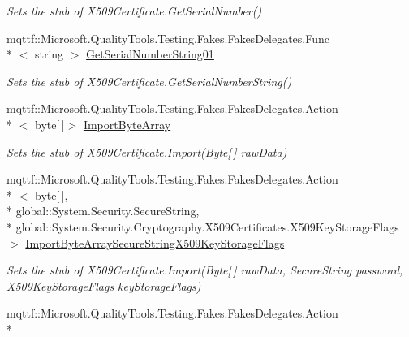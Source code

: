 \begin{DoxyCompactItemize}
\begin{DoxyCompactList}\small\item\em Sets the stub of X509\-Certificate.\-Get\-Serial\-Number()\end{DoxyCompactList}\item 
mqttf\-::\-Microsoft.\-Quality\-Tools.\-Testing.\-Fakes.\-Fakes\-Delegates.\-Func\\*
$<$ string $>$ \hyperlink{class_system_1_1_security_1_1_cryptography_1_1_x509_certificates_1_1_fakes_1_1_stub_x509_certificate_a5f0772ea53aebaf182afbcadb75f357c}{Get\-Serial\-Number\-String01}
\begin{DoxyCompactList}\small\item\em Sets the stub of X509\-Certificate.\-Get\-Serial\-Number\-String()\end{DoxyCompactList}\item 
mqttf\-::\-Microsoft.\-Quality\-Tools.\-Testing.\-Fakes.\-Fakes\-Delegates.\-Action\\*
$<$ byte\mbox{[}$\,$\mbox{]}$>$ \hyperlink{class_system_1_1_security_1_1_cryptography_1_1_x509_certificates_1_1_fakes_1_1_stub_x509_certificate_aaef214bfaef049fc7dda4081b8ee140f}{Import\-Byte\-Array}
\begin{DoxyCompactList}\small\item\em Sets the stub of X509\-Certificate.\-Import(\-Byte\mbox{[}$\,$\mbox{]} raw\-Data)\end{DoxyCompactList}\item 
mqttf\-::\-Microsoft.\-Quality\-Tools.\-Testing.\-Fakes.\-Fakes\-Delegates.\-Action\\*
$<$ byte\mbox{[}$\,$\mbox{]}, \\*
global\-::\-System.\-Security.\-Secure\-String, \\*
global\-::\-System.\-Security.\-Cryptography.\-X509\-Certificates.\-X509\-Key\-Storage\-Flags $>$ \hyperlink{class_system_1_1_security_1_1_cryptography_1_1_x509_certificates_1_1_fakes_1_1_stub_x509_certificate_afb45024c43d95adbb36e3c4d27497cc1}{Import\-Byte\-Array\-Secure\-String\-X509\-Key\-Storage\-Flags}
\begin{DoxyCompactList}\small\item\em Sets the stub of X509\-Certificate.\-Import(\-Byte\mbox{[}$\,$\mbox{]} raw\-Data, Secure\-String password, X509\-Key\-Storage\-Flags key\-Storage\-Flags)\end{DoxyCompactList}\item 
mqttf\-::\-Microsoft.\-Quality\-Tools.\-Testing.\-Fakes.\-Fakes\-Delegates.\-Action\\*

\end{DoxyCompactItemize}
